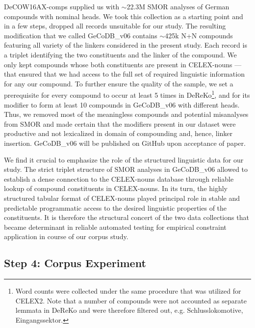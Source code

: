 \documentclass[10pt, a4paper]{article}
\begin{document}
DeCOW16AX-comps supplied us with $\sim$22.3M SMOR \citep{schmid_2004} analyses of German compounds with nominal heads. We took this collection as a starting point and in a few steps, dropped all records unsuitable for our study. The resulting modification that we called GeCoDB\_v06 contains $\sim$425k N+N compounds featuring all variety of the linkers considered in the present study. Each record is a triplet identifying the two constituents and the linker of the compound. We only kept compounds whose both constituents are present in CELEX-nouns --- that ensured that we had access to the full set of required linguistic information for any our compound. To further ensure the quality of the sample, we set a prerequisite for every compound to occur at least 5 times in DeReKo\footnote{Word counts were collected under the same procedure that was utilized for CELEX2. Note that a number of compounds were not accounted as separate lemmata in DeReKo and were therefore filtered out, e.g. Schlusslokomotive, Eingangssektor.}, and for its modifier to form at least 10 compounds in GeCoDB\_v06 with different heads. Thus, we removed most of the meaningless compounds and potential misanalyses from SMOR and made certain that the modifiers present in our dataset were productive and not lexicalized in domain of compounding and, hence, linker insertion. GeCoDB\_v06 will be published on GitHub upon acceptance of paper.

We find it crucial to emphasize the role of the structured linguistic data for our study. The strict triplet structure of SMOR analyses in GeCoDB\_v06 allowed to establish a dense connection to the CELEX-nouns database through reliable lookup of compound constituents in CELEX-nouns. In its turn, the highly structured tabular format of CELEX-nouns played principal role in stable and predictable programmatic access to the desired linguistic properties of the constituents. It is therefore the structural concert of the two data collections that became determinant in reliable automated testing for empirical constraint application in course of our corpus study.


\subsection{Step 4: Corpus Experiment}
\label{sec:exp}
\end{document}
